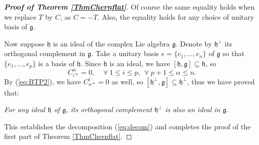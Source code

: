 \documentclass{amsart}
\numberwithin{equation}{section}
\theoremstyle{definition}
\renewcommand{\1}{\mathds{1}}
\renewcommand{\>}{\rightarrow}
\begin{document}
\begin{proof}[{\bf Proof of Theorem \ref{ThmChernflat}}]
Of course the same equality holds when we replace $T$ by $C$, as $C=-T$. Also, the equality holds for any choice of unitary basis of ${\mathfrak g}$.

Now suppose ${\mathfrak h}$ is an ideal of the complex Lie algebra ${\mathfrak g}$. Denote by ${\mathfrak h}^{\perp}$ its orthogonal complement in ${\mathfrak g}$. Take a unitary basis $e=\{ e_1, \ldots , e_n\}  $ of ${\mathfrak g}$ so that $\{ e_1, \ldots , e_p\} $ is a basis of ${\mathfrak h}$. Since ${\mathfrak h}$ is an ideal, we have $[{\mathfrak h},{\mathfrak g}]\subseteq {\mathfrak h}$, so
$$ C^{\alpha}_{i\ast} =0 , \ \ \ \ \ \forall \ 1\leq i\leq p, \ \ \forall \ p+1\leq \alpha \leq n.$$
By (\ref{eq:BTP2}), we have $C^i_{\alpha \ast}=0$ as well, so  $[{\mathfrak h}^{\perp},{\mathfrak g}]\subseteq {\mathfrak h}^{\perp}$, thus we have proved that:

{\em For any ideal ${\mathfrak h}$ of ${\mathfrak g}$, its orthogonal complement ${\mathfrak h}^{\perp}$ is also an ideal in ${\mathfrak g}$. }

This establishes the decomposition (\ref{eq:decom}) and completes the proof of the first part of Theorem \ref{ThmChernflat}.


\end{proof}
\end{document}
